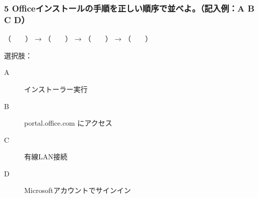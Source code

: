 \documentclass[a4paper,6pt]{jsarticle}
\begin{document}
\subsubsection*{5 Officeインストールの手順を正しい順序で並べよ。（記入例：A B C D）}

（　　） → （　　） → （　　） → （　　）

選択肢： 
\begin{description}
  \item[A] インストーラー実行
  \item[B] portal.office.com にアクセス
  \item[C] 有線LAN接続
  \item[D] Microsoftアカウントでサインイン
\end{description}
\end{document}
